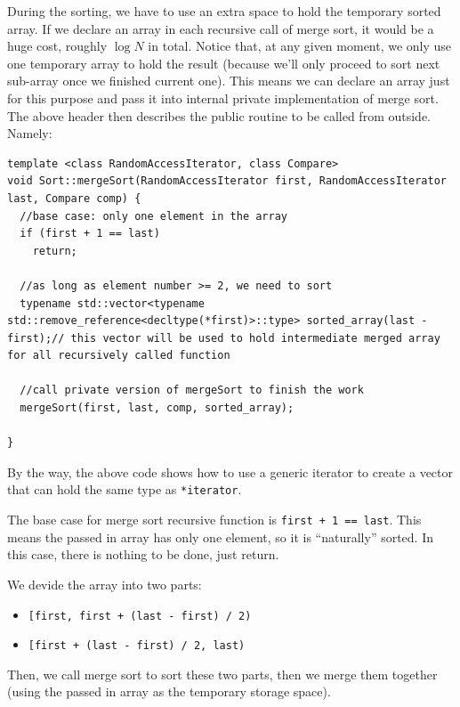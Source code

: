 \documentclass[11pt]{book}
\begin{document}
During the sorting, we have to use an extra space to hold the temporary sorted array. If we declare an array in each recursive call of merge sort, it would be a huge cost, roughly \(\log{N}\) in total. Notice that, at any given moment, we only use one temporary array to hold the result (because we'll only proceed to sort next sub-array once we finished current one). This means we can declare an array just for this purpose and pass it into internal private implementation of merge sort. The above header then describes the public routine to be called from outside. Namely:
\begin{verbatim}
template <class RandomAccessIterator, class Compare>
void Sort::mergeSort(RandomAccessIterator first, RandomAccessIterator last, Compare comp) {
  //base case: only one element in the array
  if (first + 1 == last)
    return;

  //as long as element number >= 2, we need to sort
  typename std::vector<typename std::remove_reference<decltype(*first)>::type> sorted_array(last - first);// this vector will be used to hold intermediate merged array for all recursively called function 

  //call private version of mergeSort to finish the work 
  mergeSort(first, last, comp, sorted_array);

}

\end{verbatim}
By the way, the above code shows how to use a generic iterator to create a vector that can hold the same type as \texttt{*iterator}.

The base case for merge sort recursive function is \texttt{first + 1 == last}. This means the passed in array has only one element, so it is ``naturally'' sorted. In this case, there is nothing to be done, just return.

We devide the array into two parts:
\begin{itemize}
\item \texttt{[first, first + (last - first) / 2)}
\item \texttt{[first + (last - first) / 2, last)}
\end{itemize}
Then, we call merge sort to sort these two parts, then we merge them together (using the passed in array as the temporary storage space).
\end{document}
